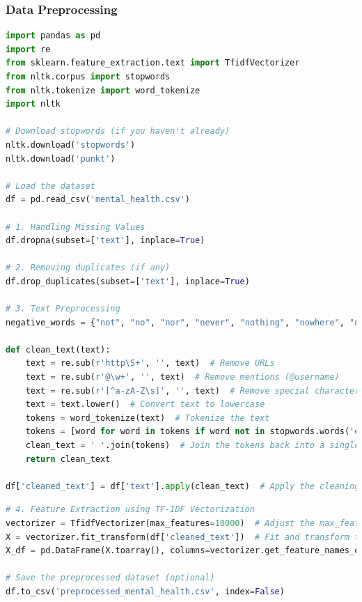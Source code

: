\pagebreak

\subsubsection{Data Preprocessing}

\begin{tcolorbox}[colback=gray!5!white, colframe=gray!80!black, boxrule=0.5pt, title=Text Preprocessing]
    \begin{lstlisting}[language=Python]
import pandas as pd
import re
from sklearn.feature_extraction.text import TfidfVectorizer
from nltk.corpus import stopwords
from nltk.tokenize import word_tokenize
import nltk

# Download stopwords (if you haven't already)
nltk.download('stopwords')
nltk.download('punkt')

# Load the dataset
df = pd.read_csv('mental_health.csv')

# 1. Handling Missing Values
df.dropna(subset=['text'], inplace=True)

# 2. Removing duplicates (if any)
df.drop_duplicates(subset=['text'], inplace=True)

# 3. Text Preprocessing
negative_words = {"not", "no", "nor", "never", "nothing", "nowhere", "neither", "cannot", "n't", "without", "barely", "hardly", "scarcely"}

def clean_text(text):
    text = re.sub(r'http\S+', '', text)  # Remove URLs
    text = re.sub(r'@\w+', '', text)  # Remove mentions (@username)
    text = re.sub(r'[^a-zA-Z\s]', '', text)  # Remove special characters, numbers, and punctuations
    text = text.lower()  # Convert text to lowercase
    tokens = word_tokenize(text)  # Tokenize the text
    tokens = [word for word in tokens if word not in stopwords.words('english') or word in negative_words]  # Remove stopwords, but keep negative words
    clean_text = ' '.join(tokens)  # Join the tokens back into a single string
    return clean_text

df['cleaned_text'] = df['text'].apply(clean_text)  # Apply the cleaning function to the 'text' column

\end{lstlisting}
\end{tcolorbox}

\begin{tcolorbox}[colback=gray!5!white, colframe=gray!80!black, boxrule=0.5pt, title=Text Preprocessing]
\begin{lstlisting}[language=Python]
# 4. Feature Extraction using TF-IDF Vectorization
vectorizer = TfidfVectorizer(max_features=10000)  # Adjust the max_features
X = vectorizer.fit_transform(df['cleaned_text'])  # Fit and transform the cleaned text data
X_df = pd.DataFrame(X.toarray(), columns=vectorizer.get_feature_names_out())  # Convert the result to a DataFrame for easier understanding

# Save the preprocessed dataset (optional)
df.to_csv('preprocessed_mental_health.csv', index=False)
    \end{lstlisting}
\end{tcolorbox}

